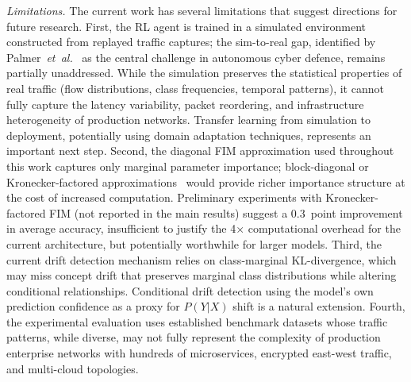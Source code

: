 \documentclass[journal]{IEEEtran}
\theoremstyle{definition}
\theoremstyle{remark}
\begin{document}
\textit{Limitations.} The current work has several limitations that suggest directions for future research. First, the RL agent is trained in a simulated environment constructed from replayed traffic captures; the sim-to-real gap, identified by Palmer~\textit{et~al.}~\cite{palmer2024acdsurvey} as the central challenge in autonomous cyber defence, remains partially unaddressed. While the simulation preserves the statistical properties of real traffic (flow distributions, class frequencies, temporal patterns), it cannot fully capture the latency variability, packet reordering, and infrastructure heterogeneity of production networks. Transfer learning from simulation to deployment, potentially using domain adaptation techniques, represents an important next step. Second, the diagonal FIM approximation used throughout this work captures only marginal parameter importance; block-diagonal or Kronecker-factored approximations~\cite{lee2020ekfac} would provide richer importance structure at the cost of increased computation. Preliminary experiments with Kronecker-factored FIM (not reported in the main results) suggest a 0.3~point improvement in average accuracy, insufficient to justify the 4$\times$ computational overhead for the current architecture, but potentially worthwhile for larger models. Third, the current drift detection mechanism relies on class-marginal KL-divergence, which may miss concept drift that preserves marginal class distributions while altering conditional relationships. Conditional drift detection using the model's own prediction confidence as a proxy for $P(Y|X)$ shift is a natural extension. Fourth, the experimental evaluation uses established benchmark datasets whose traffic patterns, while diverse, may not fully represent the complexity of production enterprise networks with hundreds of microservices, encrypted east-west traffic, and multi-cloud topologies.
\end{document}
